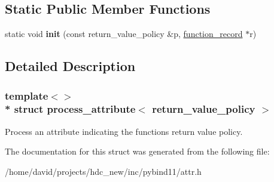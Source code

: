 \subsection*{Static Public Member Functions}
\begin{DoxyCompactItemize}
\item 
static void {\bfseries init} (const return\+\_\+value\+\_\+policy \&p, \hyperlink{structfunction__record}{function\+\_\+record} $\ast$r)\hypertarget{structprocess__attribute_3_01return__value__policy_01_4_a2e7b34a8067d2365b0b6ded2745c1134}{}\label{structprocess__attribute_3_01return__value__policy_01_4_a2e7b34a8067d2365b0b6ded2745c1134}

\end{DoxyCompactItemize}


\subsection{Detailed Description}
\subsubsection*{template$<$$>$\\*
struct process\+\_\+attribute$<$ return\+\_\+value\+\_\+policy $>$}

Process an attribute indicating the function\textquotesingle{}s return value policy. 

The documentation for this struct was generated from the following file\+:\begin{DoxyCompactItemize}
\item 
/home/david/projects/hdc\+\_\+new/inc/pybind11/attr.\+h\end{DoxyCompactItemize}
